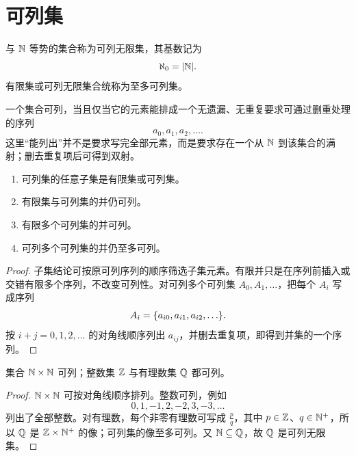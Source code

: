 \section{可列集}

\begin{definition}[可列集]\label{countable-set}
  与 $\mathbb{N}$ 等势的集合称为可列无限集，其基数记为
  \[
  \aleph_0=\lvert\mathbb{N}\rvert.
  \]
  有限集或可列无限集合统称为至多可列集。
\end{definition}

一个集合可列，当且仅当它的元素能排成一个无遗漏、无重复要求可通过删重处理的序列
\[
a_0,a_1,a_2,\ldots .
\]
这里“能列出”并不是要求写完全部元素，而是要求存在一个从 $\mathbb{N}$ 到该集合的满射；删去重复项后可得到双射。

\begin{theorem}[可列集的基本封闭性]\label{countable-closure}
  \begin{enumerate}
    \item 可列集的任意子集是有限集或可列集。
    \item 有限集与可列集的并仍可列。
    \item 有限多个可列集的并可列。
    \item 可列多个可列集的并仍至多可列。
  \end{enumerate}
\end{theorem}

\begin{proof}
  子集结论可按原可列序列的顺序筛选子集元素。有限并只是在序列前插入或交错有限多个序列，不改变可列性。对可列多个可列集 $A_0,A_1,\ldots$，把每个 $A_i$ 写成序列
  \[
  A_i=\{a_{i0},a_{i1},a_{i2},\ldots\}.
  \]
  按 $i+j=0,1,2,\ldots$ 的对角线顺序列出 $a_{ij}$，并删去重复项，即得到并集的一个序列。
\end{proof}


\begin{theorem}\label{n2-q-countable}
  集合 $\mathbb{N}\times\mathbb{N}$ 可列；整数集 $\mathbb{Z}$ 与有理数集 $\mathbb{Q}$ 都可列。
\end{theorem}

\begin{proof}
  $\mathbb{N}\times\mathbb{N}$ 可按对角线顺序排列。整数可列，例如
  \[
  0,1,-1,2,-2,3,-3,\ldots
  \]
  列出了全部整数。对有理数，每个非零有理数可写成 $\frac pq$，其中 $p\in\mathbb{Z}$、$q\in\mathbb{N}^+$，所以 $\mathbb{Q}$ 是 $\mathbb{Z}\times\mathbb{N}^+$ 的像；可列集的像至多可列。又 $\mathbb{N}\subseteq\mathbb{Q}$，故 $\mathbb{Q}$ 是可列无限集。
\end{proof}

